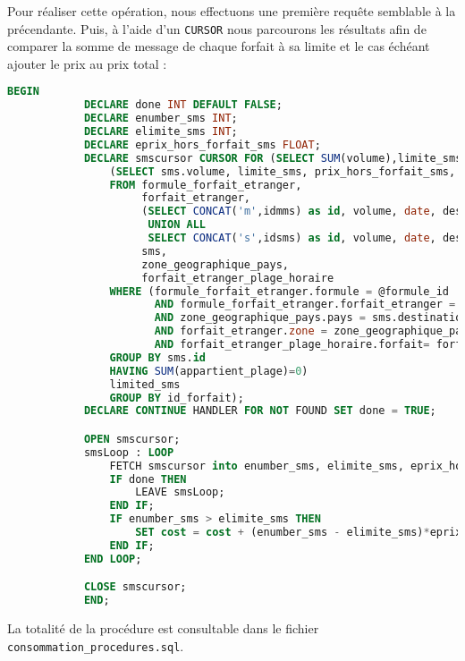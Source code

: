 Pour réaliser cette opération, nous effectuons une première requête semblable à la précendante. Puis, à l'aide d'un \texttt{CURSOR} nous parcourons les résultats afin de comparer la somme de message de chaque forfait à sa limite et le cas échéant ajouter le prix au prix total :


\begin{lstlisting}[language=sql]
 BEGIN
            DECLARE done INT DEFAULT FALSE;
            DECLARE enumber_sms INT;
            DECLARE elimite_sms INT;
            DECLARE eprix_hors_forfait_sms FLOAT;
            DECLARE smscursor CURSOR FOR (SELECT SUM(volume),limite_sms, prix_hors_forfait_sms FROM
                (SELECT sms.volume, limite_sms, prix_hors_forfait_sms, isInPlageHoraire(sms.date, forfait_etranger_plage_horaire.plage) AS appartient_plage, forfait_etranger.id as id_forfait
                FROM formule_forfait_etranger,
                     forfait_etranger,
                     (SELECT CONCAT('m',idmms) as id, volume, date, destination FROM mms WHERE consommation=consoId
                      UNION ALL
                      SELECT CONCAT('s',idsms) as id, volume, date, destination FROM sms WHERE consommation=consoId)
                     sms,
                     zone_geographique_pays,
                     forfait_etranger_plage_horaire
                WHERE (formule_forfait_etranger.formule = @formule_id
                       AND formule_forfait_etranger.forfait_etranger = forfait_etranger.id
                       AND zone_geographique_pays.pays = sms.destination
                       AND forfait_etranger.zone = zone_geographique_pays.zone_geographique
                       AND forfait_etranger_plage_horaire.forfait= forfait_etranger.id)
                GROUP BY sms.id
                HAVING SUM(appartient_plage)=0)
                limited_sms
                GROUP BY id_forfait);
            DECLARE CONTINUE HANDLER FOR NOT FOUND SET done = TRUE;

            OPEN smscursor;
            smsLoop : LOOP
                FETCH smscursor into enumber_sms, elimite_sms, eprix_hors_forfait_sms;
                IF done THEN
                    LEAVE smsLoop;
                END IF;
                IF enumber_sms > elimite_sms THEN
                    SET cost = cost + (enumber_sms - elimite_sms)*eprix_hors_forfait_sms;
                END IF;
            END LOOP;

            CLOSE smscursor;
            END;
\end{lstlisting}

La totalité de la procédure est consultable dans le fichier \texttt{consommation\_procedures.sql}.
